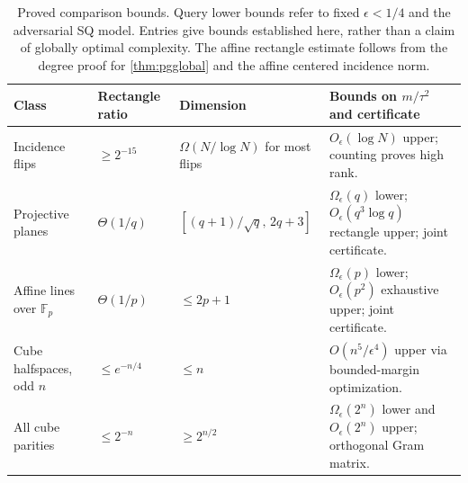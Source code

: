 \begin{table}[t]
\centering\footnotesize
\begin{tabularx}{\linewidth}{@{}p{.23\linewidth}p{.19\linewidth}p{.20\linewidth}X@{}}
\toprule
Class & Rectangle ratio & Dimension & Bounds on $m/\tau^2$ and certificate\\\midrule
Incidence flips & $\ge2^{-15}$ & $\Omega(N/\log N)$ for most flips & $O_\epsilon(\log N)$ upper; counting proves high rank.\\
Projective planes & $\Theta(1/q)$ & $[(q+1)/\sqrt q,\,2q+3]$ & $\Omega_\epsilon(q)$ lower; $O_\epsilon(q^3\log q)$ rectangle upper; joint certificate.\\
Affine lines over $\mathbb F_p$ & $\Theta(1/p)$ & $\le2p+1$ & $\Omega_\epsilon(p)$ lower; $O_\epsilon(p^2)$ exhaustive upper; joint certificate.\\
Cube halfspaces, odd $n$ & $\le e^{-n/4}$ & $\le n$ & $O(n^5/\epsilon^4)$ upper via bounded-margin optimization.\\
All cube parities & $\le2^{-n}$ & $\ge2^{n/2}$ & $\Omega_\epsilon(2^n)$ lower and $O_\epsilon(2^n)$ upper; orthogonal Gram matrix.\\
\bottomrule
\end{tabularx}
\caption{Proved comparison bounds. Query lower bounds refer to fixed $\epsilon<1/4$ and the adversarial SQ model. Entries give bounds established here, rather than a claim of globally optimal complexity. The affine rectangle estimate follows from the degree proof for \cref{thm:pgglobal} and the affine centered incidence norm.}\label{tab:examples}
\end{table}
